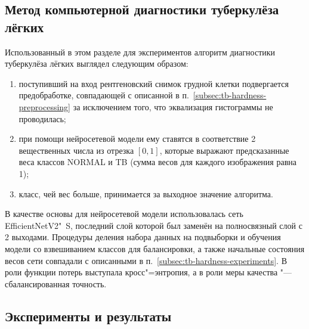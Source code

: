 \subsection{Метод компьютерной диагностики туберкулёза лёгких}\label{subsec:tbx-diagnostics}

Использованный в этом разделе для экспериментов алгоритм диагностики туберкулёза лёгких выглядел следующим образом:
\begin{enumerate}[beginpenalty=10000]
	\item поступивший на вход рентгеновский снимок грудной клетки подвергается предобработке, совпадающей с описанной в п.~\ref{subsec:tb-hardness-preprocessing} за исключением того, что эквализация гистограммы не проводилась;
	\item при помощи нейросетевой модели ему ставятся в соответствие 2 вещественных числа из отрезка $\left[ 0, 1 \right]$, которые выражают предсказанные веса классов NORMAL и TB (сумма весов для каждого изображения равна 1);
	\item класс, чей вес больше, принимается за выходное значение алгоритма.
\end{enumerate}

В качестве основы для нейросетевой модели использовалась сеть EfficientNetV2"~S, последний слой которой был заменён на полносвязный слой с 2 выходами. Процедуры деления набора данных на подвыборки и обучения модели со взвешиванием классов для балансировки, а также начальные состояния весов сети совпадали с описанными в п.~\ref{subsec:tb-hardness-experiments}. В роли функции потерь выступала кросс"=энтропия, а в роли меры качества "--- сбалансированная точность.

%

\subsection{Эксперименты и результаты}

